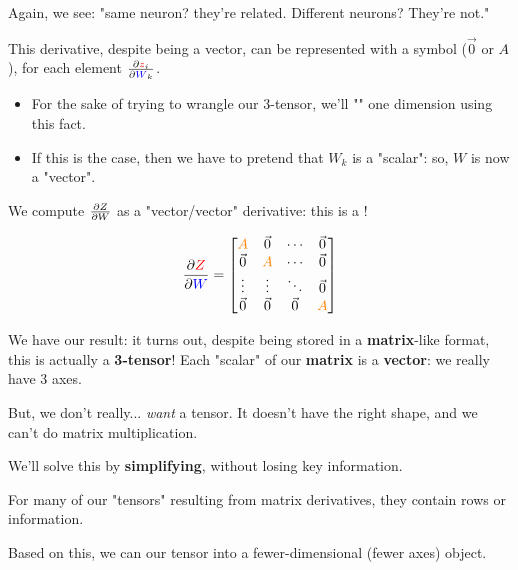         Again, we see: "same neuron? they're related. Different neurons? They're not."

        \subsecdiv

        This derivative, despite being a vector, can be represented with a  symbol ($\vec{0}$ or $A$), for each element $\frac{\partial  \textcolor{red}{z}_i }{\partial  \textcolor{blue}{W}_{k} }$.
        
        \begin{itemize}
            \item For the sake of trying to wrangle our 3-tensor, we'll "" one dimension using this fact.
            \item If this is the case, then we have to pretend that $W_k$ is a "scalar": so, $W$ is now a "vector".
        \end{itemize}

        
        
        We compute $\frac{\partial Z}{\partial W}$ as a "vector/vector" derivative: this is a !
        
        \begin{equation}
            \frac{\partial  \textcolor{red}{Z} }{\partial  \textcolor{blue}{W} } 
            =
            \begin{bmatrix}
                \textcolor{orange}{A} & \vec{0} & \cdots  & \vec{0} \\
                \vec{0} & \textcolor{orange}{A} & \cdots  & \vec{0} \\
                \vdots  & \vdots  & \ddots  & \vec{0} \\
                \vec{0} & \vec{0} & \vec{0} & \textcolor{orange}{A}
            \end{bmatrix}
        \end{equation}
        
        We have our result: it turns out, despite being stored in a \textbf{matrix}-like format, this is actually a \textbf{3-tensor}! Each "scalar" of our \textbf{matrix} is a \textbf{vector}: we really have 3 axes.
        
        \subsecdiv
        
        But, we don't really... \textit{want} a tensor. It doesn't have the right shape, and we can't do matrix multiplication.
        
        We'll solve this by \textbf{simplifying}, without losing key information.\\

        \begin{concept}
            For many of our "tensors" resulting from matrix derivatives, they contain  rows or  information. 
            
            Based on this, we can  our tensor into a fewer-dimensional (fewer axes) object.
        \end{concept}
        

